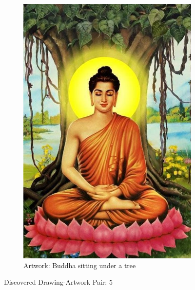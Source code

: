 \begin{figure}
\begin{subfigure}[b]{0.45\textwidth}
         \includegraphics[width=\textwidth]{images/new_discoveries/buddha-eyes-closed.jpg}
         \caption{Artwork: Buddha sitting under a tree}
         \label{fig:buddha-eyes-closed}
     \end{subfigure}
     \caption{Discovered Drawing-Artwork Pair: 5}
\end{figure}
